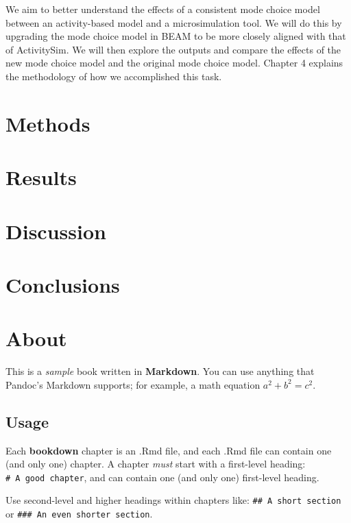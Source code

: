 \documentclass[12pt, oneside, openright]{byuthesis}
\begin{document}
We aim to better understand the effects of a consistent mode choice model between an activity-based model and a microsimulation tool. We will do this by upgrading the mode choice model in BEAM to be more closely aligned with that of ActivitySim. We will then explore the outputs and compare the effects of the new mode choice model and the original mode choice model. Chapter 4 explains the methodology of how we accomplished this task.

\hypertarget{methods}{%
\chapter{Methods}\label{methods}}

\hypertarget{results}{%
\chapter{Results}\label{results}}

\hypertarget{discussion}{%
\chapter{Discussion}\label{discussion}}

\hypertarget{conclusions}{%
\chapter{Conclusions}\label{conclusions}}

\hypertarget{about}{%
\chapter{About}\label{about}}

This is a \emph{sample} book written in \textbf{Markdown}. You can use anything that Pandoc's Markdown supports; for example, a math equation \(a^2 + b^2 = c^2\).

\hypertarget{usage}{%
\section{Usage}\label{usage}}

Each \textbf{bookdown} chapter is an .Rmd file, and each .Rmd file can contain one (and only one) chapter. A chapter \emph{must} start with a first-level heading: \texttt{\#\ A\ good\ chapter}, and can contain one (and only one) first-level heading.

Use second-level and higher headings within chapters like: \texttt{\#\#\ A\ short\ section} or \texttt{\#\#\#\ An\ even\ shorter\ section}.
\end{document}

